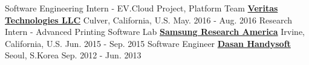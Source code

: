 \begin{cventries}
\cventry
{Software Engineering Intern - EV.Cloud Project, Platform Team} %
{\href{https://www.veritas.com/}{\bf Veritas Technologies LLC}}  %
{Culver, California, U.S.} %
{May. 2016 - Aug. 2016} %
{
}
\vspace{-3mm}	
\cventry
{Research Intern -  Advanced Printing Software Lab} %
{\href{http://www.sra.samsung.com}{\bf Samsung Research America}} %
{Irvine, California, U.S.} %
{Jun. 2015 - Sep. 2015} %
{
}
\vspace{-3mm}	
\cventry
{Software Engineer} %
{\href{http://www.handysoft.co.kr}{\bf Dasan Handysoft}} %
{Seoul, S.Korea} %
{Sep. 2012 - Jun. 2013} %
{
}
\end{cventries}
